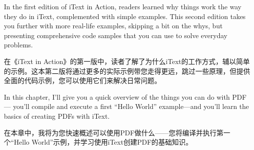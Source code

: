 In the first edition of iText in Action, readers learned why things work the way they do in iText, complemented with simple examples. This second edition takes you further with more real-life examples, skipping a bit on the whys, but presenting comprehensive code samples that you can use to solve everyday problems.

在《iText in Action》的第一版中，读者了解了为什么iText的工作方式，辅以简单的示例。这本第二版将通过更多的实际示例带您走得更远，跳过一些原理，但提供全面的代码示例，您可以使用它们来解决日常问题。

In this chapter, I’ll give you a quick overview of the things you can do with PDF—
you’ll compile and execute a first “Hello World” example—and you’ll learn the basics of creating PDFs with iText.

在本章中，我将为您快速概述可以使用PDF做什么——您将编译并执行第一个“Hello World”示例，并学习使用iText创建PDF的基础知识。